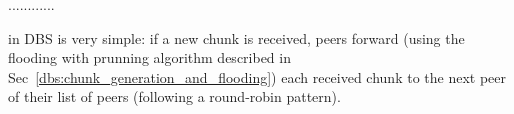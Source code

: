 ............

in DBS is very simple: if a new chunk is
received, peers forward (using the flooding with prunning algorithm
described in Sec~\ref{dbs:chunk_generation_and_flooding}) each
received chunk to the next peer of their list of peers (following a
round-robin pattern).


\begin{comment}
A ${\cal P}_i$ forwards one or more chunks if and only if it has
received a chunk. For each received chunk $c_j$, ${\cal P}_i$: 1)
creates a list $l_{c_j}$ with the contents of $N'({\cal P}_i)$, and 2)
sends $c_j$ to $l_{c_j}[0]$ (the first element), and removes
$l_{c_j}[0]$. For each chunk reception, Step 2) is repeated for all
the previously created lists while they are not exhausted.

A solution is a forwarding algorithm based on the following
idea. Peers manage a list of chunks, where every item is a 2-tuple
($c_k$, $P_l$). The field $c_k$ represents the chunk that must be
flooded (if the node that has delivered the chunk is the splitter,
$c_k$ must be relayed towards all the neighbors, otherwise, $c_k$ must
be sent to all the neighbors except the peer that delivered $c_k$),
and the field $P_l$ the last neighbor to which $c_k$ was sent. For
every chunk received, a new tuple is appended to the list of chunks
and the rest of tuples are updated. The field $c_k$ remains constant
but $P_l$ is replaced by the next peer in the list of neighbors for
every received chunk.
\end{comment}
